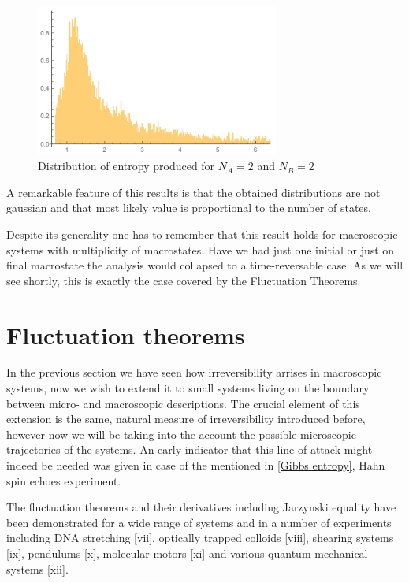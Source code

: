\documentclass[a4paper,12pt]{article}
\begin{document}
\begin{figure}[ht!]
\centering \includegraphics[width=8cm]{dissipation} \caption{Distribution of entropy produced for $N_A = 2$ and $N_B=2$}
\label{Fig4} 
\end{figure}

A remarkable feature of this results is that the obtained distributions are not gaussian and that most likely value is proportional to the number of states. 

Despite its generality one has to remember that this result holds for macroscopic systems with multiplicity of macrostates. Have we had just one initial or just on final macrostate the analysis would collapsed to a time-reversable case. As we will see shortly, this is exactly the case covered by the Fluctuation Theorems.

\section{Fluctuation theorems}

In the previous section we have seen how irreversibility arrises in macroscopic systems, now we wish to extend it to small systems living on the boundary between micro- and macroscopic descriptions. The crucial element of this extension is the same, natural measure of irreversibility introduced before, however now we will be taking into the account the possible microscopic trajectories of the systems. 
An early indicator that this line of attack might indeed be needed was given in case of the mentioned in \ref{Gibbs entropy}, Hahn spin echoes experiment.

The fluctuation theorems and their derivatives including Jarzynski equality have been demonstrated for a wide range of systems and in a number of experiments including DNA stretching [vii], optically trapped colloids [viii], shearing systems [ix], pendulums [x], molecular motors [xi] and various quantum mechanical systems [xii].
\end{document}
